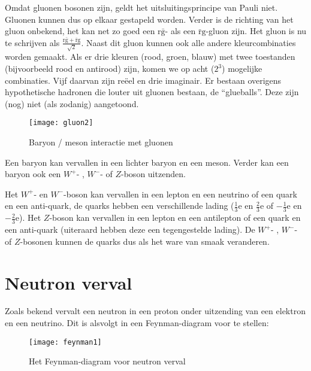 Omdat gluonen bosonen zijn, geldt het uitsluitingsprincipe van Pauli
niet. Gluonen kunnen dus op elkaar gestapeld worden. Verder is de
richting van het gluon onbekend, het kan net zo goed een $\mathrm{r\bar{g}}$-
als een $\mathrm{\bar{r}g}$-gluon zijn. Het gluon is nu te schrijven
als $\frac{\mathrm{r\bar{g}+\bar{r}g}}{\sqrt{2}}$. Naast dit gluon
kunnen ook alle andere kleurcombinaties worden gemaakt. Als er drie
kleuren (rood, groen, blauw) met twee toestanden (bijvoorbeeld rood
en antirood) zijn, komen we op acht ($2^{3}$) mogelijke combinaties.
Vijf daarvan zijn reëel en drie imaginair. Er bestaan overigens hypothetische
hadronen die louter uit gluonen bestaan, de ``glueballs''. Deze
zijn (nog) niet (als zodanig) aangetoond.

\begin{figure}[h]
\noindent \begin{centering}
\texttt{[image: gluon2]}
\par\end{centering}

\caption{Baryon / meson interactie met gluonen}
\end{figure}


Een baryon kan vervallen in een lichter baryon en een meson. Verder
kan een baryon ook een $W^{+}$- , $W^{-}$- of $Z$-boson uitzenden.

Het $W^{+}$- en $W^{-}$-boson kan vervallen in een lepton en een
neutrino of een quark en een anti-quark, de quarks hebben een verschillende
lading ($\frac{1}{3}\mathrm{e}$ en $\frac{2}{3}\mathrm{e}$ of $-\frac{1}{3}\mathrm{e}$
en $-\frac{2}{3}\mathrm{e}$). Het $Z$-boson kan vervallen in een
lepton en een antilepton of een quark en een anti-quark (uiteraard
hebben deze een tegengestelde lading). De $W^{+}$- , $W^{-}$- of
$Z$-bosonen kunnen de quarks dus als het ware van smaak veranderen.


\section{Neutron verval}

Zoals bekend vervalt een neutron in een proton onder uitzending van
een elektron en een neutrino. Dit is alsvolgt in een Feynman-diagram
voor te stellen:

\begin{figure}[h]
\noindent \begin{centering}
\texttt{[image: feynman1]}
\par\end{centering}

\caption{Het Feynman-diagram voor neutron verval}
\end{figure}


